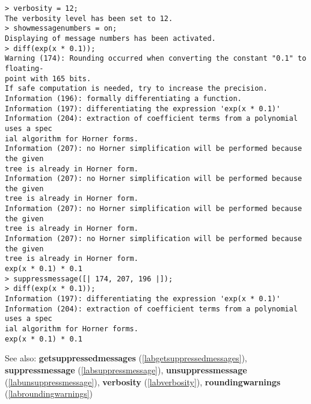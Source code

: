 \begin{center}\begin{minipage}{15cm}\begin{Verbatim}[frame=single]
> verbosity = 12;
The verbosity level has been set to 12.
> showmessagenumbers = on; 
Displaying of message numbers has been activated.
> diff(exp(x * 0.1));
Warning (174): Rounding occurred when converting the constant "0.1" to floating-
point with 165 bits.
If safe computation is needed, try to increase the precision.
Information (196): formally differentiating a function.
Information (197): differentiating the expression 'exp(x * 0.1)'
Information (204): extraction of coefficient terms from a polynomial uses a spec
ial algorithm for Horner forms.
Information (207): no Horner simplification will be performed because the given 
tree is already in Horner form.
Information (207): no Horner simplification will be performed because the given 
tree is already in Horner form.
Information (207): no Horner simplification will be performed because the given 
tree is already in Horner form.
Information (207): no Horner simplification will be performed because the given 
tree is already in Horner form.
exp(x * 0.1) * 0.1
> suppressmessage([| 174, 207, 196 |]);
> diff(exp(x * 0.1));
Information (197): differentiating the expression 'exp(x * 0.1)'
Information (204): extraction of coefficient terms from a polynomial uses a spec
ial algorithm for Horner forms.
exp(x * 0.1) * 0.1
\end{Verbatim}
\end{minipage}\end{center}
See also: \textbf{getsuppressedmessages} (\ref{labgetsuppressedmessages}), \textbf{suppressmessage} (\ref{labsuppressmessage}), \textbf{unsuppressmessage} (\ref{labunsuppressmessage}), \textbf{verbosity} (\ref{labverbosity}), \textbf{roundingwarnings} (\ref{labroundingwarnings})
